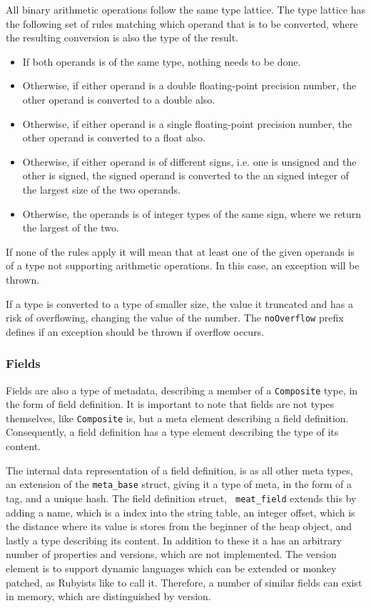 All binary arithmetic operations follow the same type lattice. The type lattice
has the following set of rules matching which operand that is to be converted,
where the resulting conversion is also the type of the result.

\begin{itemize}
  \item If both operands is of the same type, nothing needs to be done.
  \item Otherwise, if either operand is a double floating-point precision
    number, the other operand is converted to a double also.
  \item Otherwise, if either operand is a single floating-point precision
    number, the other operand is converted to a float also.
  \item Otherwise, if either operand is of different signs, i.e. one is unsigned
    and the other is signed, the signed operand is converted to the an signed
    integer of the largest size of the two operands.
  \item Otherwise, the operands is of integer types of the same sign, where we
    return the largest of the two.
\end{itemize}

If none of the rules apply it will mean that at least one of the given operands
is of a type not supporting arithmetic operations. In this case, an exception
will be thrown.

If a type is converted to a type of smaller size, the value it truncated and has
a risk of overflowing, changing the value of the number. The {\tt noOverflow}
prefix defines if an exception should be thrown if overflow occurs.

\subsubsection{Fields}
\label{sec:implementation:meta:fields}

Fields are also a type of metadata, describing a member of a {\tt Composite}
type, in the form of field definition. It is important to note that fields are
not types themselves, like {\tt Composite} is, but a meta element describing a
field definition. Consequently, a field definition has a type element describing
the type of its content.

The internal data representation of a field definition, is as all other meta
types, an extension of the {\tt meta\_base} struct, giving it a type of meta, in
the form of a tag, and a unique hash. The field definition struct, {\tt
  meat\_field} extends this by adding a name, which is a index into the string
table, an integer offset, which is the distance where its value is stores from
the beginner of the heap object, and lastly a type describing its content. In
addition to these it a has an arbitrary number of properties and versions, which
are not implemented. The version element is to support dynamic languages
which can be extended or monkey patched, as Rubyists like to call it. Therefore,
a number of similar fields can exist in memory, which are distinguished by
version. %

